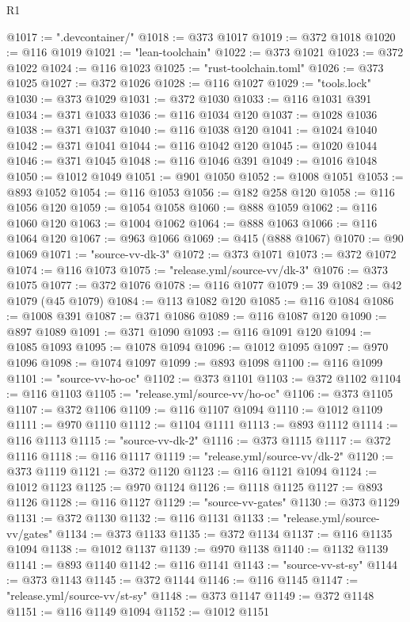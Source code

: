 \begin{lexlean}{R1}
\begin{coremodule}
@1017 := ".devcontainer/"
@1018 := @373 @1017
@1019 := @372 @1018
@1020 := @116 @1019
@1021 := "lean-toolchain"
@1022 := @373 @1021
@1023 := @372 @1022
@1024 := @116 @1023
@1025 := "rust-toolchain.toml"
@1026 := @373 @1025
@1027 := @372 @1026
@1028 := @116 @1027
@1029 := "tools.lock"
@1030 := @373 @1029
@1031 := @372 @1030
@1033 := @116 @1031 @391
@1034 := @371 @1033
@1036 := @116 @1034 @120
@1037 := @1028 @1036
@1038 := @371 @1037
@1040 := @116 @1038 @120
@1041 := @1024 @1040
@1042 := @371 @1041
@1044 := @116 @1042 @120
@1045 := @1020 @1044
@1046 := @371 @1045
@1048 := @116 @1046 @391
@1049 := @1016 @1048
@1050 := @1012 @1049
@1051 := @901 @1050
@1052 := @1008 @1051
@1053 := @893 @1052
@1054 := @116 @1053
@1056 := @182 @258 @120
@1058 := @116 @1056 @120
@1059 := @1054 @1058
@1060 := @888 @1059
@1062 := @116 @1060 @120
@1063 := @1004 @1062
@1064 := @888 @1063
@1066 := @116 @1064 @120
@1067 := @963 @1066
@1069 := @415 (@888 @1067)
@1070 := @90 @1069
@1071 := "source-vv-dk-3"
@1072 := @373 @1071
@1073 := @372 @1072
@1074 := @116 @1073
@1075 := "release.yml/source-vv/dk-3"
@1076 := @373 @1075
@1077 := @372 @1076
@1078 := @116 @1077
@1079 := 39
@1082 := @42 @1079 (@45 @1079)
@1084 := @113 @1082 @120
@1085 := @116 @1084
@1086 := @1008 @391
@1087 := @371 @1086
@1089 := @116 @1087 @120
@1090 := @897 @1089
@1091 := @371 @1090
@1093 := @116 @1091 @120
@1094 := @1085 @1093
@1095 := @1078 @1094
@1096 := @1012 @1095
@1097 := @970 @1096
@1098 := @1074 @1097
@1099 := @893 @1098
@1100 := @116 @1099
@1101 := "source-vv-ho-oc"
@1102 := @373 @1101
@1103 := @372 @1102
@1104 := @116 @1103
@1105 := "release.yml/source-vv/ho-oc"
@1106 := @373 @1105
@1107 := @372 @1106
@1109 := @116 @1107 @1094
@1110 := @1012 @1109
@1111 := @970 @1110
@1112 := @1104 @1111
@1113 := @893 @1112
@1114 := @116 @1113
@1115 := "source-vv-dk-2"
@1116 := @373 @1115
@1117 := @372 @1116
@1118 := @116 @1117
@1119 := "release.yml/source-vv/dk-2"
@1120 := @373 @1119
@1121 := @372 @1120
@1123 := @116 @1121 @1094
@1124 := @1012 @1123
@1125 := @970 @1124
@1126 := @1118 @1125
@1127 := @893 @1126
@1128 := @116 @1127
@1129 := "source-vv-gates"
@1130 := @373 @1129
@1131 := @372 @1130
@1132 := @116 @1131
@1133 := "release.yml/source-vv/gates"
@1134 := @373 @1133
@1135 := @372 @1134
@1137 := @116 @1135 @1094
@1138 := @1012 @1137
@1139 := @970 @1138
@1140 := @1132 @1139
@1141 := @893 @1140
@1142 := @116 @1141
@1143 := "source-vv-st-sy"
@1144 := @373 @1143
@1145 := @372 @1144
@1146 := @116 @1145
@1147 := "release.yml/source-vv/st-sy"
@1148 := @373 @1147
@1149 := @372 @1148
@1151 := @116 @1149 @1094
@1152 := @1012 @1151

\end{coremodule}
\end{lexlean}
